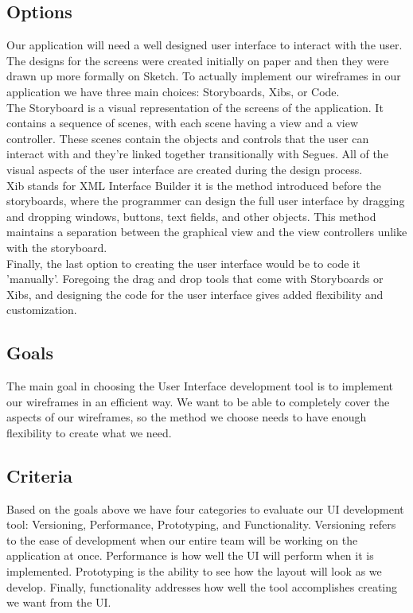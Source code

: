 \documentclass[letterpaper,10pt,titlepage]{article}
\begin{document}
\subsection{Options}
Our application will need a well designed user interface to interact with the user. The designs for the screens were created initially on paper and then they were drawn up more formally on Sketch. To actually implement our wireframes in our application we have three main choices: Storyboards, Xibs, or Code.\\

The Storyboard is a visual representation of the screens of the application. It contains a sequence of scenes, with each scene having a view and a view controller. These scenes contain the objects and controls that the user can interact with and they're linked together transitionally with Segues. All of the visual aspects of the user interface are created during the design process.\\

Xib stands for XML Interface Builder it is the method introduced before the storyboards, where the programmer can design the full user interface by dragging and dropping windows, buttons, text fields, and other objects. This method maintains a separation between the graphical view and the view controllers unlike with the storyboard.\\

Finally, the last option to creating the user interface would be to code it 'manually'. Foregoing the drag and drop tools that come with Storyboards or Xibs, and designing the code for the user interface gives added flexibility and customization.\cite{uipara1}\\

\subsection{Goals}

The main goal in choosing the User Interface development tool is to implement our wireframes in an efficient way. We want to be able to completely cover the aspects of our wireframes, so the method we choose needs to have enough flexibility to create what we need.\\

\subsection{Criteria}

Based on the goals above we have four categories to evaluate our UI development tool: Versioning, Performance, Prototyping, and Functionality. Versioning refers to the ease of development when our entire team will be working on the application at once. Performance is how well the UI will perform when it is implemented. Prototyping is the ability to see how the layout will look as we develop. Finally, functionality addresses how well the tool accomplishes creating we want from the UI.\\
\end{document}
